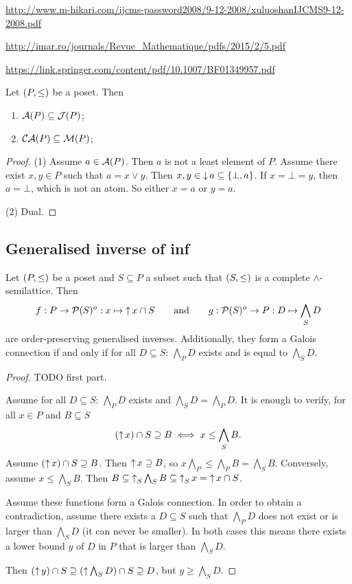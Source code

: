 \url{http://www.m-hikari.com/ijcms-password2008/9-12-2008/xuluoshanIJCMS9-12-2008.pdf}

\url{http://imar.ro/journals/Revue_Mathematique/pdfs/2015/2/5.pdf}

\url{https://link.springer.com/content/pdf/10.1007/BF01349957.pdf}

\begin{lemma} \label{atomsJoinIrriducible}
Let $\left( P,\leq \right)$ be a poset. Then
\begin{enumerate}
\item $\operatorname{\mathcal{A}}(P) \subseteq \operatorname{\mathcal{J}}(P)$;
\item $\operatorname{\mathcal{CA}}(P) \subseteq \operatorname{\mathcal{M}}(P)$;
\end{enumerate}
\end{lemma}
\begin{proof}
(1) Assume $a\in \operatorname{\mathcal{A}}(P)$. Then $a$ is not a least element of $P$. Assume there exist $x,y\in P$ such that $a = x\vee y$. Then $x,y\in \operatorname{\downarrow} a \subseteq \{\bot, a\}$. If $x= \bot = y$, then $a = \bot$, which is not an atom. So either $x = a$ or $y = a$.

(2) Dual.
\end{proof}


\subsection{Generalised inverse of inf}
\begin{proposition}
Let $\left( P,\leq \right)$ be a poset and $S\subseteq P$ a subset such that $\left( S,\leq \right)$ is a complete $\wedge$-semilattice. Then
\[ f: P \to \operatorname{\mathcal{P}}(S)^o: x\mapsto \operatorname{\uparrow} x \cap S \qquad\text{and}\qquad g: \operatorname{\mathcal{P}}(S)^o\to P: D\mapsto \bigwedge_S D \]
are order-preserving generalised inverses. Additionally, they form a Galois connection \textup{if and only if} for all $D\subseteq S$: $\bigwedge_P D$ exists and is equal to $\bigwedge_S D$.
\end{proposition}
\begin{proof}
TODO first part.

Assume for all $D\subseteq S$: $\bigwedge_P D$ exists and $\bigwedge_S D = \bigwedge_P D$. It is enough to verify, for all $x\in P$ and $B\subseteq S$
\[ (\operatorname{\uparrow} x)\cap S \supseteq B \iff x\leq \bigwedge_S B. \]
Assume $(\operatorname{\uparrow} x)\cap S \supseteq B$. Then $\operatorname{\uparrow} x \supseteq B$, so $x \bigwedge_P \leq \bigwedge_P B = \bigwedge_S B$. Conversely, assume $x\leq \bigwedge_S B$. Then $B\subseteq \operatorname{\uparrow}_S\bigwedge_S B \subseteq \operatorname{\uparrow}_S x = \operatorname{\uparrow} x\cap S$.

Assume these functions form a Galois connection. In order to obtain a contradiction, assume there exists a $D\subseteq S$ such that $\bigwedge_P D$ does not exist or is larger than $\bigwedge_S D$ (it can never be smaller). In both cases this means there exists a lower bound $y$ of $D$ in $P$ that is larger than $\bigwedge_S D$.

Then $(\operatorname{\uparrow} y)\cap S \supseteq (\operatorname{\uparrow} \bigwedge_S D)\cap S \supseteq D$, but $y\geq \bigwedge_S D$.
\end{proof}

